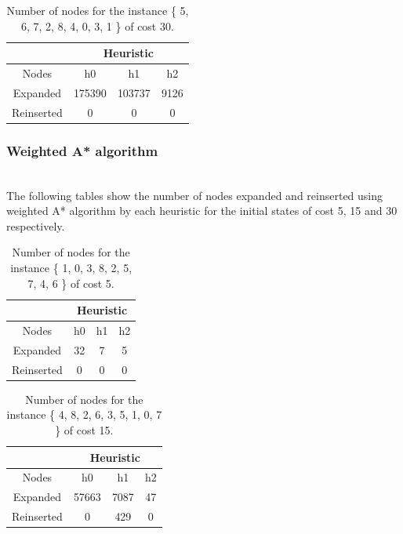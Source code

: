 \documentclass[runningheads]{llncs}
\begin{document}
\begin{table}[H]
    \centering
\caption{\label{tab:table3}Number of nodes for the instance \{ 5, 6, 7, 2, 8, 4, 0, 3, 1 \} of cost 30.}
    \begin{tabular}{|c|c|c|c|}
    \hline
       & \multicolumn{3}{|c|}{Heuristic} \\ \hline
        Nodes & h0 & h1 & h2 \\ \hline
        Expanded & 175390 & 103737 & 9126 \\ \hline
        Reinserted & 0 & 0 & 0 \\ \hline
    \end{tabular}
\end{table}

\subsubsection{Weighted A* algorithm}~\\
The following tables show the number of nodes expanded and reinserted using weighted A* algorithm by each heuristic for the initial states of cost 5, 15 and 30 respectively.

\begin{table}[H]
    \centering
\caption{\label{tab:table1}Number of nodes for the instance \{ 1, 0, 3, 8, 2, 5, 7, 4, 6 \} of cost 5.}
    \begin{tabular}{|c|c|c|c|}
    \hline
       & \multicolumn{3}{|c|}{Heuristic} \\ \hline
        Nodes & h0 & h1 & h2 \\ \hline
        Expanded & 32 & 7 & 5 \\ \hline
        Reinserted & 0 & 0 & 0 \\ \hline
    \end{tabular}
\end{table}

\begin{table}[H]
    \centering
\caption{\label{tab:table2}Number of nodes for the instance \{ 4, 8, 2, 6, 3, 5, 1, 0, 7 \} of cost 15.}
    \begin{tabular}{|c|c|c|c|}
    \hline
       & \multicolumn{3}{|c|}{Heuristic} \\ \hline
        Nodes & h0 & h1 & h2 \\ \hline
        Expanded & 57663 & 7087 & 47 \\ \hline
        Reinserted & 0 & 429 & 0 \\ \hline
    \end{tabular}
\end{table}
\end{document}
